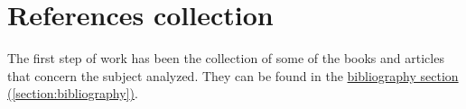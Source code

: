 
\section{References collection}
\label{section:referencescollection}

The first step of work has been the collection of some of the books and articles that concern the subject analyzed.
They can be found in the \hyperref[section:bibliography]{bibliography section (\ref{section:bibliography})}.\\
